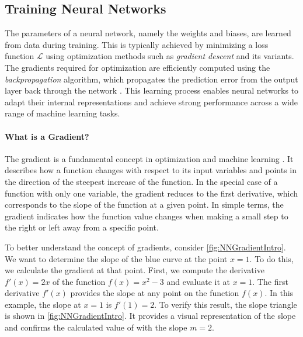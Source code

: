 















\subsection{Training Neural Networks}
The parameters of a neural network, namely the weights and biases, are learned from data during training. This is typically achieved by minimizing a loss function $\mathcal{L}$ using optimization methods such as \textit{gradient descent} and its variants. The gradients required for optimization are efficiently computed using the \textit{backpropagation} algorithm, which propagates the prediction error from the output layer back through the network \cite{Rumelhart1986LearningRB}. This learning process enables neural networks to adapt their internal representations and achieve strong performance across a wide range of machine learning tasks.

\paragraph{What is a Gradient?} 
The gradient is a fundamental concept in optimization and machine learning \cite{Rumelhart1986LearningRB, Bottou2016OptimizationMF}. It describes how a function changes with respect to its input variables and points in the direction of the steepest increase of the function. In the special case of a function with only one variable, the gradient reduces to the first derivative, which corresponds to the slope of the function at a given point.
In simple terms, the gradient indicates how the function value changes when making a small step to the right or left away from a specific point.




To better understand the concept of gradients, consider \autoref{fig:NNGradientIntro}. We want to determine the slope of the blue curve at the point $x=1$. To do this, we calculate the gradient at that point. First, we compute the derivative $f'(x)=2x$ of the function $f(x)=x^2-3$ and evaluate it at $x=1$. The first derivative $f'(x)$ provides the slope at any point on the function $f(x)$. In this example, the slope at $x=1$ is $f'(1)=2$. To verify this result, the slope triangle is shown in \autoref{fig:NNGradientIntro}. It provides a visual representation of the slope and confirms the calculated value of with the slope $m=2$.

